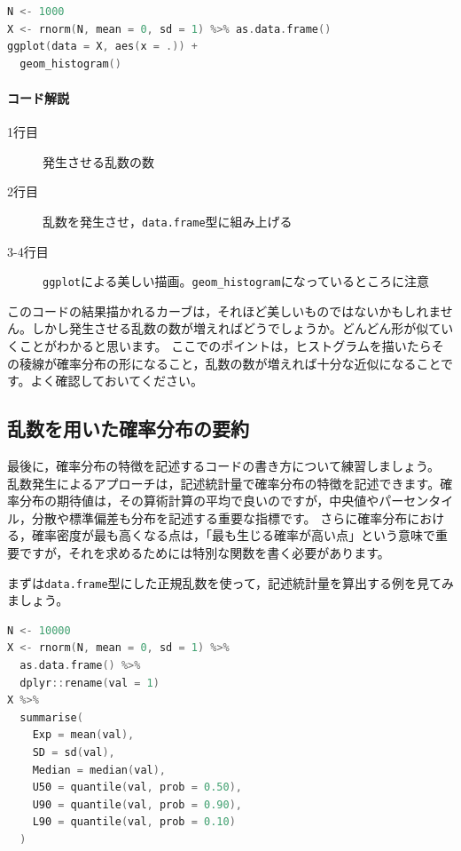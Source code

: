\documentclass{ltjsbook}
\begin{document}
\begin{lstlisting}[language=c++,label={code::17_04},caption={確率分布の可視化1}]
N <- 1000
X <- rnorm(N, mean = 0, sd = 1) %>% as.data.frame()
ggplot(data = X, aes(x = .)) +
  geom_histogram()
\end{lstlisting}
\paragraph{コード解説}
    \begin{description}
            \item[1行目] 発生させる乱数の数
            \item[2行目] 乱数を発生させ，\texttt{data.frame}型に組み上げる
            \item[3-4行目] \texttt{ggplot}による美しい描画。\verb|geom_histogram|になっているところに注意
\end{description}
このコードの結果描かれるカーブは，それほど美しいものではないかもしれません。しかし発生させる乱数の数が増えればどうでしょうか。どんどん形が似ていくことがわかると思います。
ここでのポイントは，ヒストグラムを描いたらその稜線が確率分布の形になること，乱数の数が増えれば十分な近似になることです。よく確認しておいてください。

\subsection{乱数を用いた確率分布の要約}
最後に，確率分布の特徴を記述するコードの書き方について練習しましょう。
乱数発生によるアプローチは，記述統計量で確率分布の特徴を記述できます。確率分布の期待値は，その算術計算の平均で良いのですが，中央値やパーセンタイル，分散や標準偏差も分布を記述する重要な指標です。
さらに確率分布における，確率密度が最も高くなる点は，「最も生じる確率が高い点」という意味で重要ですが，それを求めるためには特別な関数を書く必要があります。

まずは\texttt{data.frame}型にした正規乱数を使って，記述統計量を算出する例を見てみましょう。

\begin{lstlisting}[language=c++,label={code::17_05},caption={確率分布の要約}]
N <- 10000
X <- rnorm(N, mean = 0, sd = 1) %>%
  as.data.frame() %>%
  dplyr::rename(val = 1)
X %>%
  summarise(
    Exp = mean(val),
    SD = sd(val),
    Median = median(val),
    U50 = quantile(val, prob = 0.50),
    U90 = quantile(val, prob = 0.90),
    L90 = quantile(val, prob = 0.10)
  )
\end{lstlisting}
\end{document}
